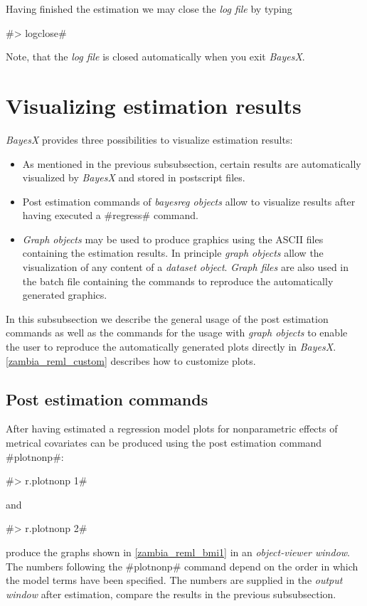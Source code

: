 \documentclass[11pt,a4paper,twoside]{bayesxreport}
\begin{document}
Having finished the estimation we may close the {\it log file} by
typing

#> logclose#

Note, that the {\it log file} is closed automatically when you exit
{\em BayesX}.

\section{Visualizing estimation results}\label{zambia_reml_visual}

{\em BayesX} provides three possibilities to visualize estimation
results:
\begin{itemize}
\item As mentioned in the previous subsubsection, certain results
are automatically visualized by {\em BayesX} and stored in
postscript files. \item Post estimation commands of {\em bayesreg
objects} allow to visualize results after having executed a
#regress# command. \item {\em Graph objects} may be used to produce
graphics using the ASCII files containing the estimation results. In
principle {\em graph objects} allow the visualization of any content
of a {\em dataset object}. {\em Graph files} are also used in the
batch file containing the commands to reproduce the automatically
generated graphics.
\end{itemize}

In this subsubsection we describe the general usage of the post
estimation commands as well as the commands for the usage with {\em
graph objects} to enable the user to reproduce the automatically
generated plots directly in {\em BayesX}.
\autoref{zambia_reml_custom} describes how to customize plots.

\subsection{Post estimation commands}

After having estimated a regression model plots for nonparametric
effects of metrical covariates can be produced using the post
estimation command #plotnonp#:

#> r.plotnonp 1#

and

#> r.plotnonp 2#

produce the graphs shown in \autoref{zambia_reml_bmi1} in an {\it
object-viewer window}. The numbers following the #plotnonp# command
depend on the order in which the model terms have been specified.
The numbers are supplied in the {\em output window} after
estimation, compare the results in the previous subsubsection.
\end{document}
